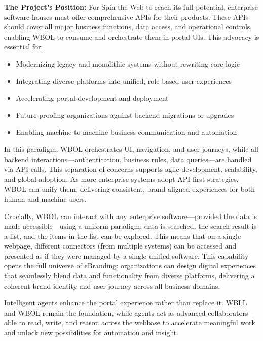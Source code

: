 \textbf{The Project's Position:} For Spin the Web to reach its full potential, enterprise software houses must offer comprehensive APIs for their products. These APIs should cover all major business functions, data access, and operational controls, enabling WBOL to consume and orchestrate them in portal UIs. This advocacy is essential for:
\begin{itemize}
	\item Modernizing legacy and monolithic systems without rewriting core logic
	\item Integrating diverse platforms into unified, role-based user experiences
	\item Accelerating portal development and deployment
	\item Future-proofing organizations against backend migrations or upgrades
	\item Enabling machine-to-machine business communication and automation
\end{itemize}

In this paradigm, WBOL orchestrates UI, navigation, and user journeys, while all backend interactions—authentication, business rules, data queries—are handled via API calls. This separation of concerns supports agile development, scalability, and global adoption. As more enterprise systems adopt API-first strategies, WBOL can unify them, delivering consistent, brand-aligned experiences for both human and machine users.

Crucially, WBOL can interact with any enterprise software—provided the data is made accessible—using a uniform paradigm: data is searched, the search result is a list, and the items in the list can be explored. This means that on a single webpage, different connectors (from multiple systems) can be accessed and presented as if they were managed by a single unified software. This capability opens the full universe of eBranding: organizations can design digital experiences that seamlessly blend data and functionality from diverse platforms, delivering a coherent brand identity and user journey across all business domains.

Intelligent agents enhance the portal experience rather than replace it. WBLL and WBOL remain the foundation, while agents act as advanced collaborators—able to read, write, and reason across the webbase to accelerate meaningful work and unlock new possibilities for automation and insight.
